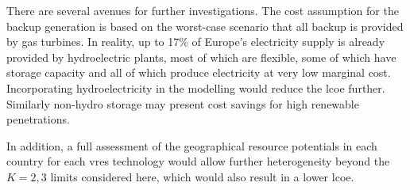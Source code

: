 \documentclass[a4paper, 5p, sort&compress]{elsarticle}%
\begin{document}

There are several avenues for further investigations. The cost assumption for the backup generation is based on the
worst-case scenario that all backup is provided by gas turbines. In
reality, up to 17\% of Europe's electricity supply is already provided
by hydroelectric plants, most of which are flexible, some of which
have storage capacity and all of which produce electricity at very low
marginal cost. Incorporating hydroelectricity in the modelling would
reduce the \gls{lcoe} further. Similarly non-hydro storage may present cost
savings for high renewable penetrations.

In addition, a full assessment of the geographical resource potentials
in each country for each \gls{vres} technology would allow further
heterogeneity beyond the $K=2,3$ limits considered here, which would
also result in a lower \gls{lcoe}.





\end{document}
